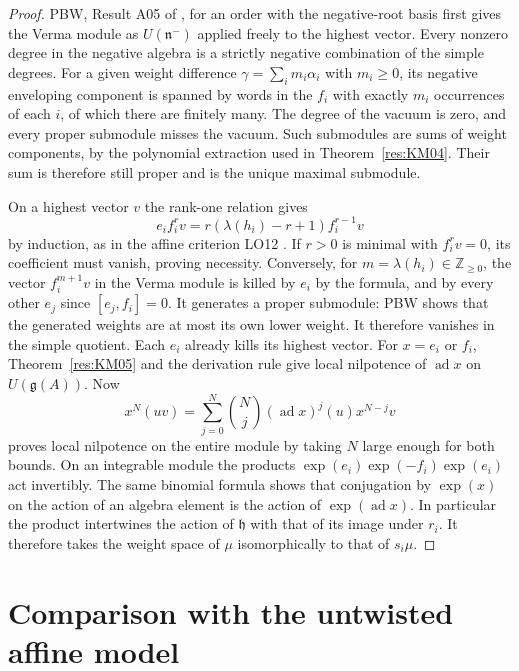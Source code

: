 \documentclass[11pt,oneside,openany]{book}
\theoremstyle{definition}
\theoremstyle{remark}
\begin{document}
\begin{proof}
PBW, Result A05 of \cite[PDF pp.~8--9]{mg-lie}, for an order
with the negative-root basis first gives the
Verma module as \(U(\mathfrak n^-)\) applied freely to the
highest vector. Every nonzero degree in the negative algebra
is a strictly negative combination of the simple degrees.
For a given weight difference \(\gamma=\sum_i m_i\alpha_i\)
with \(m_i\ge0\), its negative enveloping component is spanned
by words in the \(f_i\) with exactly \(m_i\) occurrences of
each \(i\), of which there are finitely many.
The degree of the vacuum is zero, and every proper submodule
misses the vacuum. Such submodules are sums of weight components,
by the polynomial extraction used in Theorem~\ref{res:KM04}.
Their sum is therefore still proper and is the unique maximal
submodule.

On a highest vector \(v\) the rank-one relation gives
\[
 e_i f_i^r v
   =r(\lambda(h_i)-r+1)f_i^{r-1}v
\]
by induction, as in the affine criterion LO12
\cite[PDF p.~27]{mg-reptopics}. If \(r>0\) is minimal with
\(f_i^r v=0\), its coefficient must vanish, proving necessity.
Conversely, for \(m=\lambda(h_i)\in\mathbb Z_{\ge0}\),
the vector \(f_i^{m+1}v\) in the Verma module is killed by \(e_i\)
by the formula, and by every other \(e_j\) since \([e_j,f_i]=0\).
It generates a proper submodule: PBW shows that the generated
weights are at most its own lower weight. It therefore vanishes
in the simple quotient. Each \(e_i\) already kills its highest
vector. For \(x=e_i\) or \(f_i\), Theorem~\ref{res:KM05} and the
derivation rule give local nilpotence of \(\operatorname{ad}x\)
on \(U(\mathfrak g(A))\). Now
\[
 x^N(uv)=\sum_{j=0}^N\binom Nj
       (\operatorname{ad}x)^j(u)x^{N-j}v
\]
proves local nilpotence on the entire module by taking \(N\)
large enough for both bounds. On an integrable module the
products \(\exp(e_i)\exp(-f_i)\exp(e_i)\) act invertibly.
The same binomial formula shows that conjugation by
\(\exp(x)\) on the action of an algebra element is
the action of \(\exp(\operatorname{ad}x)\). In particular the
product intertwines the action of \(\mathfrak h\) with that
of its image under \(r_i\). It therefore takes the weight
space of \(\mu\) isomorphically to that of \(s_i\mu\).
\end{proof}

\section{Comparison with the untwisted affine model}
\end{document}
